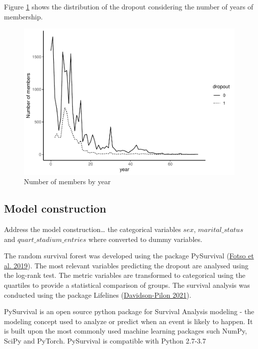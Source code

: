 \documentclass[
  12pt,
]{article}
\begin{document}
Figure \ref{fig:membershipyear} shows the distribution of the dropout
considering the number of years of membership.

\begin{figure}
\centering
\includegraphics{articleCustomerDropoutMembership_files/figure-latex/membershipyear-1.pdf}
\caption{\label{fig:membershipyear}Number of members by year}
\end{figure}

\hypertarget{model-construction}{%
\subsection{Model construction}\label{model-construction}}

Address the model construction\ldots{} the categorical variables \(sex\),
\(marital\_status\) and \(quart\_stadium\_entries\) where converted to dummy
variables.

The random survival forest was developed using the package PySurvival
(\protect\hyperlink{ref-Fotso_others_2019}{Fotso et al. 2019}). The most relevant variables predicting the dropout are
analysed using the log-rank test. The metric variables are transformed to
categorical using the quartiles to provide a statistical comparison of groups.
The survival analysis was conducted using the package Lifelines
(\protect\hyperlink{ref-Davidson-Pilon_2021}{Davidson-Pilon 2021}).

PySurvival is an open source python package for Survival Analysis modeling - the
modeling concept used to analyze or predict when an event is likely to happen.
It is built upon the most commonly used machine learning packages such NumPy,
SciPy and PyTorch. PySurvival is compatible with Python 2.7-3.7
\end{document}
